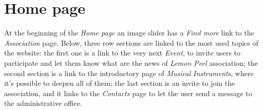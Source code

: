 \documentclass[../../DD.tex]{subfiles}
\begin{document}
\newpage
\section{Home page}
	At the beginning of the \textit{Home page} an image slider has a \textit{Find more} link to the \textit{Association} page. Below, three row sections are linked to the most used topics of the website: the first one is a link to the very next \textit{Event}, to invite users to participate and let them know what are the news of \textit{Lemon Peel} association; the second section is a link to the introductory page of \textit{Musical Instruments}, where it's possible to deepen all of them; the last section is an invite to join the association, and it links to the \textit{Contacts} page to let the user send a message to the administrative office.
\end{document}
